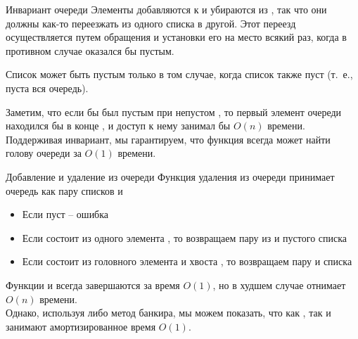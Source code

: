 \begin{frame}{Инвариант очереди}
Элементы добавляются к  и убираются из , так
что они должны как-то переезжать из одного списка в другой. Этот
переезд осуществляется путем обращения  и установки его
на место  всякий раз, когда в противном случае
 оказался бы пустым.\\

\begin{definition}
Список  может быть пустым только в том
случае, когда список  также пуст (т.~е., пуста вся
очередь).
\end{definition}
\vspace{1em}

Заметим, что если бы  был пустым при непустом
, то первый элемент очереди находился бы в конце
, и доступ к нему занимал бы $O(n)$ времени. Поддерживая
инвариант, мы гарантируем, что функция  всегда может
найти голову очереди за $O(1)$ времени.

\end{frame}


\begin{frame}[fragile]{Добавление и удаление из очереди}
Функция удаления из очереди 
принимает очередь как пару  списков  и 
\begin{itemize}
\item Если   пуст -- ошибка
\item Если  состоит из одного элемента , то возвращаем пару из   и пустого списка
\item Если  состоит из головного элемента  и хвоста , то возвращаем пару  и списка 
\end{itemize}

Функции
 и  всегда завершаются за время
$O(1)$, но  в худшем случае отнимает $O(n)$
времени. \\

Однако, используя либо метод банкира, мы
можем показать, что как , так и 
занимают амортизированное время $O(1)$.
\end{frame}


